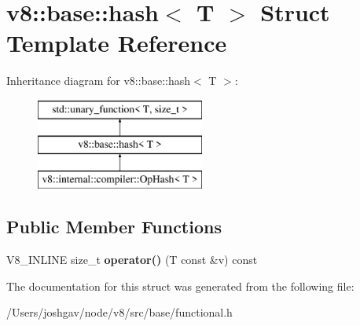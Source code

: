 \hypertarget{structv8_1_1base_1_1hash}{}\section{v8\+:\+:base\+:\+:hash$<$ T $>$ Struct Template Reference}
\label{structv8_1_1base_1_1hash}
Inheritance diagram for v8\+:\+:base\+:\+:hash$<$ T $>$\+:\begin{figure}[H]
\begin{center}
\leavevmode
\includegraphics[height=3.000000cm]{structv8_1_1base_1_1hash}
\end{center}
\end{figure}
\subsection*{Public Member Functions}
\begin{DoxyCompactItemize}
\item 
V8\+\_\+\+I\+N\+L\+I\+NE size\+\_\+t {\bfseries operator()} (T const \&v) const \hypertarget{structv8_1_1base_1_1hash_a4c5796e93ae99f5fe89b87a7c3bc429a}{}\label{structv8_1_1base_1_1hash_a4c5796e93ae99f5fe89b87a7c3bc429a}

\end{DoxyCompactItemize}


The documentation for this struct was generated from the following file\+:\begin{DoxyCompactItemize}
\item 
/\+Users/joshgav/node/v8/src/base/functional.\+h\end{DoxyCompactItemize}
